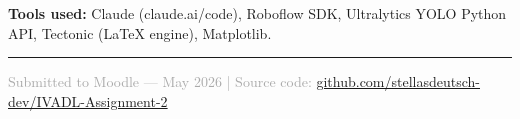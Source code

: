 \documentclass[11pt,a4paper]{article}
\begin{document}
\noindent\textbf{Tools used:} Claude (claude.ai/code), Roboflow SDK, Ultralytics YOLO Python
API, Tectonic (LaTeX engine), Matplotlib.

\vspace{12pt}
\noindent\rule{\linewidth}{0.4pt}
\vspace{2pt}
\begin{center}
  \small\textcolor{darkgray}{Submitted to Moodle --- May 2026 \quad|\quad
  Source code:
  \href{https://github.com/stellasdeutsch-dev/IVADL-Assignment-2}{github.com/stellasdeutsch-dev/IVADL-Assignment-2}}
\end{center}
\end{document}
